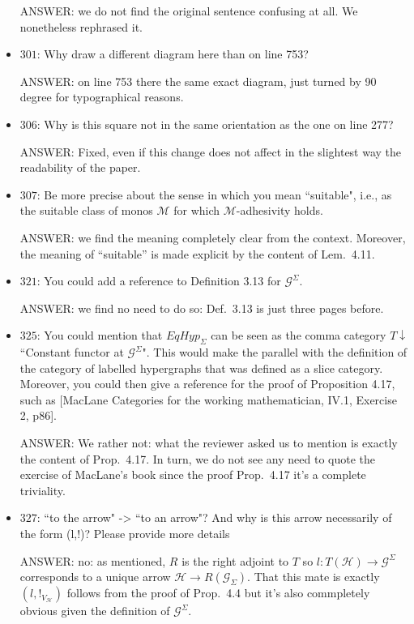 \documentclass[english,11pt,a4paper]{article}
\begin{document}
\begin{itemize}
ANSWER: we do not find the original sentence confusing at all. We nonetheless rephrased it.

\item $301$: Why draw a different diagram here than on line 753?

ANSWER: on line 753 there the same exact diagram, just turned by 90 degree for typographical reasons. 

\item $306$: Why is this square not in the same orientation as the one on line 277?

ANSWER: Fixed, even if this change does not affect in the slightest way the readability of the paper. 

\item $307$: Be more precise about the sense in which you mean ``suitable", i.e., as the suitable class of monos $\mathcal{M}$ for which $\mathcal{M}$-adhesivity holds.

ANSWER: we find the meaning completely clear from the context. Moreover, the meaning of ``suitable'' is made explicit by the content of Lem.~4.11.

\item $321$: You could add a reference to Definition 3.13 for $\mathcal{G}^\Sigma$.

ANSWER: we find no need to do so: Def.~3.13 is just three pages before.


\item $325$: You could mention that $EqHyp_\Sigma$ can be seen as the comma category $T \downarrow$ ``Constant functor at $\mathcal{G}^\Sigma$". This would make the parallel with the definition of the category of labelled hypergraphs that was defined as a slice category. Moreover, you could then give a reference for the proof of Proposition 4.17, such as [MacLane Categories for the working mathematician, IV.1, Exercise 2, p86].

ANSWER: We rather not: what the reviewer asked us to mention is exactly the content of Prop.~4.17. In turn, we do not see any need to quote the exercise of MacLane's book since the proof Prop.~4.17 it's a complete triviality.

\item $327$: ``to the arrow" -> ``to an arrow"? And why is this arrow necessarily of the form (l,!)? Please provide more details

ANSWER:  no: as mentioned, $R$  is the right adjoint to $T$ so $l\colon T(\mathcal{H})\to \mathcal{G}^\Sigma$ corresponds to a unique arrow $\mathcal{H}\to R(\mathcal{G}_\Sigma)$. That this mate is exactly $(l, !_{V_{\mathcal{H}}})$ follows from the proof of Prop.~4.4 but it's also commpletely obvious given the definition of $\mathcal{G}^\Sigma$.



\end{itemize}
\end{document}
